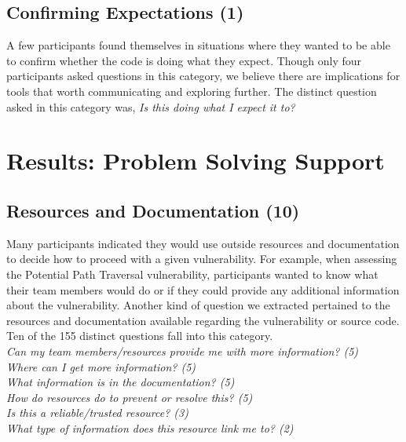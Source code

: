 \documentclass[conference]{IEEEtran}
\begin{document}

\noindent\subsection{\textbf{Confirming Expectations (1)}}\label{ce}

A few participants found themselves in situations where they wanted to be able to confirm whether the code is doing what they expect. 
Though only four participants asked questions in this category, we believe there are implications for tools that worth communicating and exploring further. 
The distinct question asked in this category was, \textit{Is this doing what I expect it to?} 
\\


\section{Results: Problem Solving Support}
\label{sec:results-pss}



\noindent\subsection{\textbf{Resources and Documentation (10)}}\label{rd}

Many participants indicated they would use outside resources and documentation to decide how to proceed with a given vulnerability.
For example, when assessing the Potential Path Traversal vulnerability, participants wanted to know what their team members would do or if they could provide any additional information about the vulnerability. 
Another kind of question we extracted pertained to the resources and documentation available regarding the vulnerability or source code. 
Ten of the 155 distinct questions fall into this category. 
\\

\noindent\emph{Can my team members/resources provide me with more information? (5)} \\
\emph{Where can I get more information? (5)} \\
\emph{What information is in the documentation? (5)} \\
\emph{How do resources do to prevent or resolve this? (5)} \\
\emph{Is this a reliable/trusted resource? (3)} \\
\emph{What type of information does this resource link me to? (2)} \\
\end{document}
